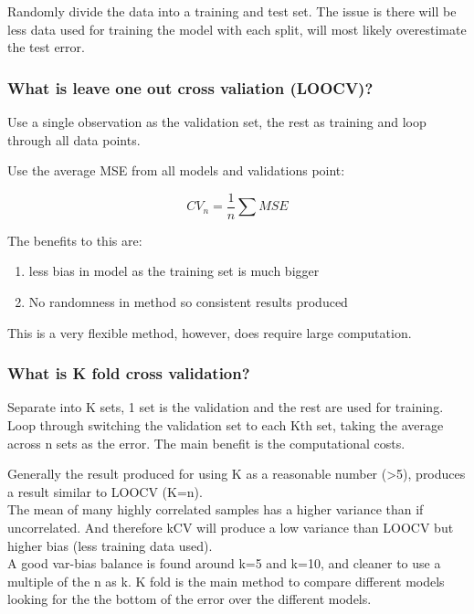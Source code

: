 \documentclass[11pt]{scrartcl} %
\begin{document}
Randomly divide the data into a training and test set. The issue is there will be less data used
for training the model with each split, will most likely overestimate the test error.

\subsubsection{What is leave one out cross valiation (LOOCV)?}

Use a single observation as the validation set, the rest as training and loop through all data points.

Use the average MSE from all models and validations point:

\begin{equation}
	CV_n = \frac{1}{n} \sum MSE
\end{equation}

The benefits to this are:
\begin{enumerate}
	\item less bias in model as the training set is much bigger
	\item No randomness in method so consistent results produced
\end{enumerate}

This is a very flexible method, however, does require large computation.

\subsubsection{What is K fold cross validation?}

Separate into K sets, 1 set is the validation and the rest are used for training. Loop through switching
the validation set to each Kth set, taking the average across n sets as the error. 
The main benefit is the computational costs.

Generally the result produced for using K as a reasonable number (>5), produces a result similar to
LOOCV (K=n).\\

The mean of many highly correlated samples has a higher variance than if uncorrelated. And therefore
kCV will produce a low variance than LOOCV but higher bias (less training data used).\\

A good var-bias balance is found around k=5 and k=10, and cleaner to use a multiple of the n as k.
K fold is the main method to compare different models looking for the the bottom of the error over the
different models.
\end{document}
